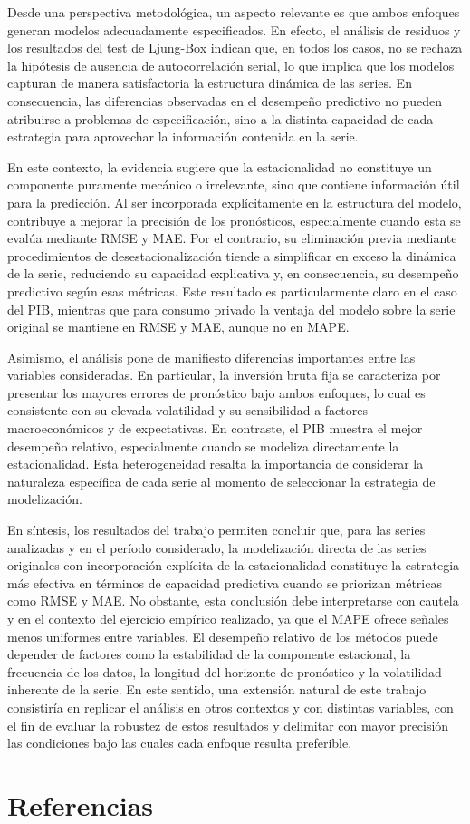 \documentclass[12pt,a4paper]{article}
\begin{document}
	Desde una perspectiva metodológica, un aspecto relevante es que ambos enfoques generan modelos adecuadamente especificados. En efecto, el análisis de residuos y los resultados del test de Ljung-Box indican que, en todos los casos, no se rechaza la hipótesis de ausencia de autocorrelación serial, lo que implica que los modelos capturan de manera satisfactoria la estructura dinámica de las series. En consecuencia, las diferencias observadas en el desempeño predictivo no pueden atribuirse a problemas de especificación, sino a la distinta capacidad de cada estrategia para aprovechar la información contenida en la serie.
	
	En este contexto, la evidencia sugiere que la estacionalidad no constituye un componente puramente mecánico o irrelevante, sino que contiene información útil para la predicción. Al ser incorporada explícitamente en la estructura del modelo, contribuye a mejorar la precisión de los pronósticos, especialmente cuando esta se evalúa mediante RMSE y MAE. Por el contrario, su eliminación previa mediante procedimientos de desestacionalización tiende a simplificar en exceso la dinámica de la serie, reduciendo su capacidad explicativa y, en consecuencia, su desempeño predictivo según esas métricas. Este resultado es particularmente claro en el caso del PIB, mientras que para consumo privado la ventaja del modelo sobre la serie original se mantiene en RMSE y MAE, aunque no en MAPE.
	
	Asimismo, el análisis pone de manifiesto diferencias importantes entre las variables consideradas. En particular, la inversión bruta fija se caracteriza por presentar los mayores errores de pronóstico bajo ambos enfoques, lo cual es consistente con su elevada volatilidad y su sensibilidad a factores macroeconómicos y de expectativas. En contraste, el PIB muestra el mejor desempeño relativo, especialmente cuando se modeliza directamente la estacionalidad. Esta heterogeneidad resalta la importancia de considerar la naturaleza específica de cada serie al momento de seleccionar la estrategia de modelización.
	
	En síntesis, los resultados del trabajo permiten concluir que, para las series analizadas y en el período considerado, la modelización directa de las series originales con incorporación explícita de la estacionalidad constituye la estrategia más efectiva en términos de capacidad predictiva cuando se priorizan métricas como RMSE y MAE. No obstante, esta conclusión debe interpretarse con cautela y en el contexto del ejercicio empírico realizado, ya que el MAPE ofrece señales menos uniformes entre variables. El desempeño relativo de los métodos puede depender de factores como la estabilidad de la componente estacional, la frecuencia de los datos, la longitud del horizonte de pronóstico y la volatilidad inherente de la serie. En este sentido, una extensión natural de este trabajo consistiría en replicar el análisis en otros contextos y con distintas variables, con el fin de evaluar la robustez de estos resultados y delimitar con mayor precisión las condiciones bajo las cuales cada enfoque resulta preferible.
	
	
	\newpage
	\section*{Referencias}
	\nocite{*}
	\printbibliography[heading=none]
	
	
\end{document}
